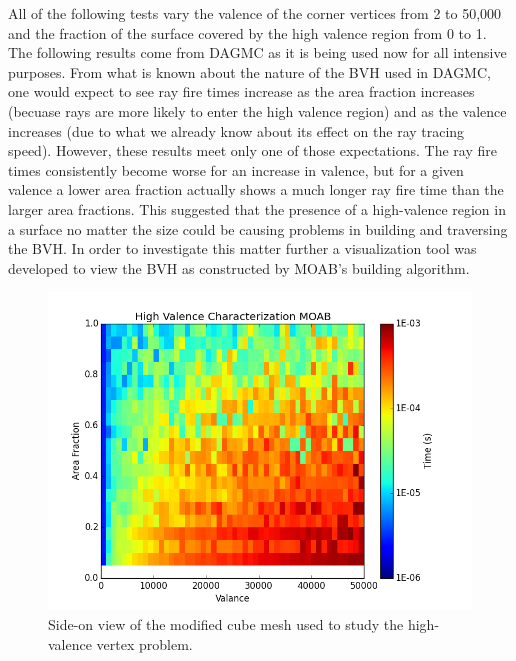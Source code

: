 \documentclass[10pt, a4paper]{article}
\begin{document}
All of the following tests vary the valence of the corner vertices from 2 to 50,000 and the fraction of the surface covered by the high valence region from 0 to 1. The following results come from DAGMC as it is being used now for all intensive purposes. From what is known about the nature of the BVH used in DAGMC, one would expect to see ray fire times increase as the area fraction increases (becuase rays are more likely to enter the high valence region) and as the valence increases (due to what we already know about its effect on the ray tracing speed). However, these results meet only one of those expectations. The ray fire times consistently become worse for an increase in valence, but for a given valence a lower area fraction actually shows a much longer ray fire time than the larger area fractions. This suggested that the presence of a high-valence region in a surface no matter the size could be causing problems in building and traversing the BVH. In order to investigate this matter further a visualization tool was developed to view the BVH as constructed by MOAB's building algorithm.

\begin{figure}[H]
  \centering
    \includegraphics[scale=0.35]{hv_study_MOAB.png}
    \caption{Side-on view of the modified cube mesh used to study the high-valence vertex problem.}
    \label{hvsideon}
\end{figure}
\end{document}
